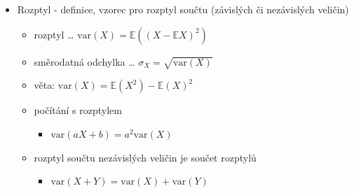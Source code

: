 \begin{itemize}
\begin{itemize}
\begin{itemize}
\end{itemize}
\item pozorování: $\mathbb E(X)=\sum_{\omega\in\Omega}X(\omega)\cdot P(\set{\omega})$
\item pravidlo naivního statistika
\begin{itemize}
\item $\mathbb E(g(X))=\sum_{x\in\text{Im}(X)}g(x)P(X=x)$
\item nebo $\mathbb E(g(X))=\int_{-\infty}^\infty g(x)f_X(x)\text dx$
\end{itemize}
\item linearita $\mathbb E(aX+b)=a\mathbb E(X)+b$ plyne z PNS pro funkci $ax+b$
\item podmíněná střední hodnota $\mathbb E(X\mid B)=\sum_{x\in\text{Im}(X)}x\cdot P(X=x\mid B)$
\item věta o celkové střední hodnotě: $\mathbb E(X)=\sum_i P(B_i)\cdot \mathbb E(X\mid B_i)$
\item $\mathbb E(g(X,Y))=\sum_x\sum_y g(x,y) P(X=x\land Y=y)$
\item $\mathbb E(aX+bY)=a\mathbb E(X)+b\mathbb E(Y)$
\item pro nezávislé $X,Y$ platí $\mathbb E(XY)=\mathbb E(X)\mathbb E(Y)$
\item Markovova nerovnost
\begin{itemize}
\item pro $X\geq 0$ a $a\gt0$ platí $P(X\geq a)\leq\frac{\mathbb E(X)}a$
\end{itemize}
\end{itemize}
\item Rozptyl - definice, vzorec pro rozptyl součtu (závislých či nezávislých veličin)
\begin{itemize}
\item rozptyl \dots{} $\text{var}(X)=\mathbb E((X-\mathbb EX)^2)$
\item směrodatná odchylka \dots{} $\sigma_X=\sqrt{\text{var}(X)}$
\item věta: $\text{var}(X)=\mathbb E(X^2)-\mathbb E(X)^2$
\item počítání s rozptylem
\begin{itemize}
\item $\mathrm{var}(aX+b)=a^2\mathrm{var}(X)$
\end{itemize}
\item rozptyl součtu nezávislých veličin je součet rozptylů
\begin{itemize}
\item $\mathrm{var}(X+Y)=\mathrm{var}(X)+\mathrm{var}(Y)$

\end{itemize}
\end{itemize}
\end{itemize}
